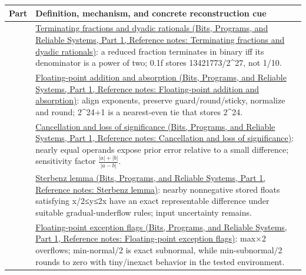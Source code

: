{\def\LTcaptype{none} %
\begin{longtable}[]{@{}
  >{\raggedright\arraybackslash}p{}
  >{\raggedright\arraybackslash}p{}@{}}
\toprule\noalign{}
\begin{minipage}[b]{\linewidth}\raggedright
Part
\end{minipage} & \begin{minipage}[b]{\linewidth}\raggedright
Definition, mechanism, and concrete reconstruction cue
\end{minipage} \\
\midrule\noalign{}
\endhead
\bottomrule\noalign{}
\endlastfoot
77 & \href{../01-Bits-Programs-and-Reliable-Systems-P01/main.pdf\#nameddest=appendix-2a2f1b74bdd3}{Terminating fractions and dyadic rationals (Bits, Programs, and Reliable Systems, Part 1, Reference notes: Terminating fractions and dyadic rationals)}: a reduced fraction terminates in binary iff its denominator is a power of two; 0.1f stores 13421773/2\^{}27, not 1/10. \\
78 & \href{../01-Bits-Programs-and-Reliable-Systems-P01/main.pdf\#nameddest=appendix-a1b1b4580dfd}{Floating-point addition and absorption (Bits, Programs, and Reliable Systems, Part 1, Reference notes: Floating-point addition and absorption)}: align exponents, preserve guard/round/sticky, normalize and round; 2\^{}24+1 is a nearest-even tie that stores 2\^{}24. \\
79 & \href{../01-Bits-Programs-and-Reliable-Systems-P01/main.pdf\#nameddest=appendix-a2773a6a2f9d}{Cancellation and loss of significance (Bits, Programs, and Reliable Systems, Part 1, Reference notes: Cancellation and loss of significance)}: nearly equal operands expose prior error relative to a small difference; sensitivity factor \(\frac{\lvert a\rvert+\lvert b\rvert}{\lvert a-b\rvert}\). \\
80 & \href{../01-Bits-Programs-and-Reliable-Systems-P01/main.pdf\#nameddest=appendix-399b7ad53f39}{Sterbenz lemma (Bits, Programs, and Reliable Systems, Part 1, Reference notes: Sterbenz lemma)}: nearby nonnegative stored floats satisfying x/2≤y≤2x have an exact representable difference under suitable gradual-underflow rules; input uncertainty remains. \\
81 & \href{../01-Bits-Programs-and-Reliable-Systems-P01/main.pdf\#nameddest=appendix-ed8531b46754}{Floating-point exception flags (Bits, Programs, and Reliable Systems, Part 1, Reference notes: Floating-point exception flags)}: max×2 overflows; min-normal/2 is exact subnormal, while min-subnormal/2 rounds to zero with tiny/inexact behavior in the tested environment. \\

\end{longtable}}
